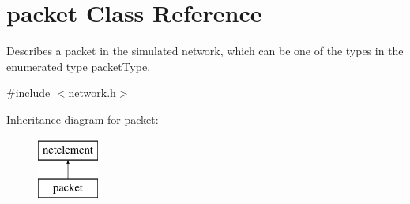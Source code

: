 \hypertarget{classpacket}{\section{packet Class Reference}
\label{classpacket}
}


Describes a packet in the simulated network, which can be one of the types in the enumerated type {\ttfamily packet\-Type}.  




{\ttfamily \#include $<$network.\-h$>$}

Inheritance diagram for packet\-:\begin{figure}[H]
\begin{center}
\leavevmode
\includegraphics[height=2.000000cm]{classpacket}
\end{center}
\end{figure}
